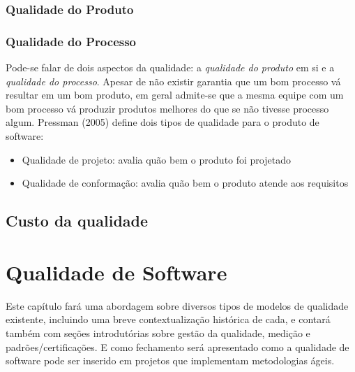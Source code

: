\documentclass[
	12pt,				%
	openright,			%
	twoside,			%
	a4paper,			%
	english,			%
	brazil,				%
	]{abntex2}
\begin{document}
\subsection{Qualidade do Produto}


\subsection{Qualidade do Processo}

Pode-se falar de dois aspectos da qualidade: a \emph{qualidade do produto} em si e a \emph{qualidade do processo}. Apesar de não existir garantia que um bom processo vá resultar em um bom produto, em geral admite-se que a mesma equipe com um bom processo vá produzir produtos melhores do que se não tivesse processo algum. Pressman (2005) define dois tipos de qualidade para o produto de software: %

\begin{itemize}
    \item Qualidade de projeto: avalia quão bem o produto foi projetado
    \item Qualidade de conformação: avalia quão bem o produto atende aos requisitos
\end{itemize}

\section{Custo da qualidade}


\chapter{Qualidade de Software}
Este capítulo fará uma abordagem sobre diversos tipos de modelos de qualidade existente, incluindo uma breve contextualização histórica de cada, e contará também com seções introdutórias sobre gestão da qualidade, medição e padrões/certificações. E como fechamento será apresentado como a qualidade de software pode ser inserido em projetos que implementam metodologias ágeis.

\end{document}
